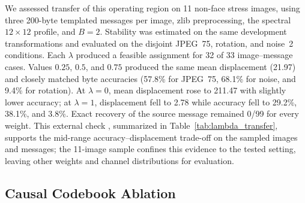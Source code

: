 \documentclass[preprint,12pt]{elsarticle}
\theoremstyle{plain}
\providecommand{\DIFaddtex}[1]{{\protect\color{blue} \sf #1}} %
\providecommand{\DIFdeltex}[1]{{\protect\color{red} \scriptsize #1}} %
\providecommand{\DIFaddbegin}{} %
\providecommand{\DIFaddend}{} %
\providecommand{\DIFdelbegin}{} %
\providecommand{\DIFdelend}{} %
\providecommand{\DIFadd}[1]{\texorpdfstring{\DIFaddtex{#1}}{#1}} %
\providecommand{\DIFdel}[1]{\texorpdfstring{\DIFdeltex{#1}}{}} %
\providecommand{\DIFscaledelfig}{0.5}
\newlength{\DIFdelgraphicswidth} %
\newlength{\DIFdelgraphicsheight} %
\providecommand{\DIFaddincludegraphics}[2][]{{\color{blue}\fbox{\DIFOincludegraphics[#1]{#2}}}} %
\providecommand{\DIFdelincludegraphics}[2][]{%
\sbox{\DIFdelgraphicsbox}{\DIFOincludegraphics[#1]{#2}}%
\settoboxwidth{\DIFdelgraphicswidth}{\DIFdelgraphicsbox} %
\settoboxtotalheight{\DIFdelgraphicsheight}{\DIFdelgraphicsbox} %
\scalebox{\DIFscaledelfig}{%
\parbox[b]{\DIFdelgraphicswidth}{\usebox{\DIFdelgraphicsbox}\\[-\baselineskip] \rule{\DIFdelgraphicswidth}{0em}}\llap{\resizebox{\DIFdelgraphicswidth}{\DIFdelgraphicsheight}{%
\setlength{\unitlength}{\DIFdelgraphicswidth}%
\begin{picture}(1,1)%
\thicklines\linethickness{2pt} %
{\color[rgb]{1,0,0}\put(0,0){\framebox(1,1){}}}%
{\color[rgb]{1,0,0}\put(0,0){\line( 1,1){1}}}%
{\color[rgb]{1,0,0}\put(0,1){\line(1,-1){1}}}%
\end{picture}%
}\hspace*{3pt}}} %
} %
\DeclareRobustCommand{\DIFaddbegin}{\DIFOaddbegin \let\includegraphics\DIFaddincludegraphics} %
\DeclareRobustCommand{\DIFaddend}{\DIFOaddend \let\includegraphics\DIFOincludegraphics} %
\DeclareRobustCommand{\DIFdelbegin}{\DIFOdelbegin \let\includegraphics\DIFdelincludegraphics} %
\DeclareRobustCommand{\DIFdelend}{\DIFOaddend \let\includegraphics\DIFOincludegraphics} %
\renewcommand{\DIFdel}[1]{}
\renewcommand{\DIFdelincludegraphics}[2][]{}
\begin{document}
We assessed transfer of this operating region on 11 non-face stress images,
using three 200-byte templated messages per image, zlib preprocessing, the
spectral $12\times12$ profile, and $B=2$. Stability was estimated on the same
development transformations and evaluated on the disjoint JPEG~75, rotation,
and noise~2 conditions. Each $\lambda$ produced a feasible assignment for 32
of 33 image--message cases. Values $0.25$, $0.5$, and $0.75$ produced the same
mean displacement (21.97) and closely matched byte accuracies (57.8\% for
JPEG~75, 68.1\% for noise, and 9.4\% for rotation). At $\lambda=0$, mean
displacement rose to 211.47 with slightly lower accuracy; at $\lambda=1$,
displacement fell to 2.78 while accuracy fell to 29.2\%, 38.1\%, and 3.8\%.
Exact recovery of the source message remained 0/99 for every weight. This
external check\DIFaddbegin \DIFadd{, summarized in Table~\ref{tab:lambda_transfer}, }\DIFaddend supports the
mid-range accuracy--displacement trade-off on the sampled images and messages; \DIFdelbegin \DIFdel{its }\DIFdelend \DIFaddbegin \DIFadd{the }\DIFaddend 11-image \DIFdelbegin \DIFdel{size does not establish a universal
weight or generalization to other channel distributions}\DIFdelend \DIFaddbegin \DIFadd{sample confines this evidence to the
tested setting, leaving other weights and channel distributions for evaluation}\DIFaddend .

\begin{table}[!t]
\centering
\caption{Stability-Aware Lambda Sweep ($B=8$, Length 100)}
\label{tab:stability_lambda}

\end{table}

\begin{table}[!t]
\centering
\small
\caption{Transfer of the Stability Weight to the Scene Holdout}
\label{tab:lambda_transfer}
\resizebox{\linewidth}{!}{}
\end{table}

\subsection{Causal Codebook Ablation}
\end{document}
